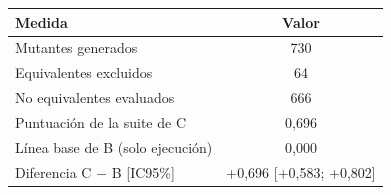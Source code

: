 \begin{tabular}{lc}
\toprule
Medida & Valor \\
\midrule
Mutantes generados & 730 \\
Equivalentes excluidos & 64 \\
No equivalentes evaluados & 666 \\
Puntuación de la suite de C & 0{,}696 \\
Línea base de B (solo ejecución) & 0{,}000 \\
Diferencia C $-$ B [IC95\%] & +0{,}696 [+0{,}583; +0{,}802] \\
\bottomrule
\end{tabular}
